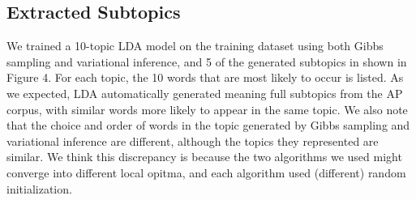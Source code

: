 \documentclass{article} %
\begin{document}
\subsection{Extracted Subtopics}
We trained a 10-topic LDA model on the training dataset using both Gibbs sampling and variational inference, and 5 of the generated subtopics in shown in Figure 4. For each topic, the 10 words that are most likely to occur is listed. As we expected, LDA automatically generated meaning full subtopics from the AP corpus, with similar words more likely to appear in the same topic. We also note that the choice and order of words in the topic generated by Gibbs sampling and variational inference are different, although the topics they represented are similar. We think this discrepancy is because the two algorithms we used might converge into different local opitma, and each algorithm used (different) random initialization.
\end{document}
